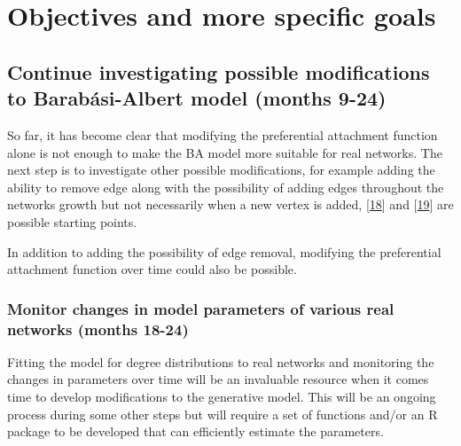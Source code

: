 \documentclass[
  10pt,
  a4paper,
]{scrreprt}
\theoremstyle{definition}
\theoremstyle{plain}
\theoremstyle{plain}
\theoremstyle{remark}
\begin{document}
{\hypertarget{objectives-and-more-specific-goals}{%
\section{Objectives and more specific
goals}\label{objectives-and-more-specific-goals}}

\hypertarget{continue-investigating-possible-modifications-to-barabuxe1si-albert-model-months-9-24}{%
\subsection*{Continue investigating possible modifications to
Barabási-Albert model (months
9-24)}\label{continue-investigating-possible-modifications-to-barabuxe1si-albert-model-months-9-24}}

So far, it has become clear that modifying the preferential attachment
function alone is not enough to make the BA model more suitable for real
networks. The next step is to investigate other possible modifications,
for example adding the ability to remove edge along with the possibility
of adding edges throughout the networks growth but not necessarily when
a new vertex is added, {[}\protect\hyperlink{ref-lu04}{18}{]} and
{[}\protect\hyperlink{ref-moore06}{19}{]} are possible starting points.

In addition to adding the possibility of edge removal, modifying the
preferential attachment function over time could also be possible.

\hypertarget{monitor-changes-in-model-parameters-of-various-real-networks-months-18-24}{%
\subsubsection*{Monitor changes in model parameters of various real
networks (months
18-24)}\label{monitor-changes-in-model-parameters-of-various-real-networks-months-18-24}}

Fitting the model for degree distributions to real networks and
monitoring the changes in parameters over time will be an invaluable
resource when it comes time to develop modifications to the generative
model. This will be an ongoing process during some other steps but will
require a set of functions and/or an R package to be developed that can
efficiently estimate the parameters.

}
\end{document}
